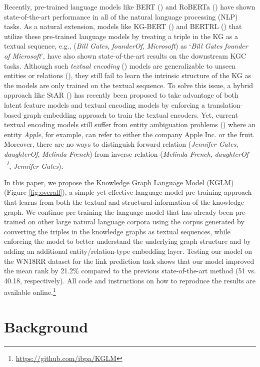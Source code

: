 \documentclass[11pt]{article}
\begin{document}
Recently, pre-trained language models like BERT (\citealp{devlin2018bert}) and RoBERTa (\citealp{liu2019roberta}) have shown state-of-the-art performance in all of the natural language processing (NLP) tasks. As a natural extension, models like KG-BERT (\citealp{yao2019kg}) and BERTRL (\citealp{zha2021inductive}) that utilize these pre-trained language models by treating a triple in the KG as a textual sequence, e.g., (\emph{Bill Gates}, \emph{founderOf}, \emph{Microsoft}) as `\emph{Bill Gates founder of Microsoft}', have also shown state-of-the-art results on the downstream KGC tasks. Although such \emph{textual encoding} (\citealp{wang2021structure}) models are generalizable to unseen entities or relations (\citealp{zha2021inductive}), they still fail to learn the intrinsic structure of the KG as the models are only trained on the textual sequence. To solve this issue, a hybrid approach like StAR (\citealp{wang2021structure}) has recently been proposed to take advantage of both latent feature models and textual encoding models by enforcing a translation-based graph embedding approach to train the textual encoders. Yet, current textual encoding models still suffer from entity ambiguation problems (\citealp{cucerzan2007large}) where an entity \emph{Apple}, for example, can refer to either the company Apple Inc. or the fruit. Moreover, there are no ways to distinguish forward relation (\emph{Jennifer Gates}, \emph{daughterOf}, \emph{Melinda French}) from inverse relation (\emph{Melinda French}, \emph{daughterOf\textsuperscript{  -1}}, \emph{Jennifer Gates}).


In this paper, we propose the Knowledge Graph Language Model (KGLM) (Figure \ref{fig:overall}), a simple yet effective language model pre-training approach that learns from both the textual and structural information of the knowledge graph. We continue pre-training the language model that has already been pre-trained on other large natural language corpora using the corpus generated by converting the triples in the knowledge graphs as textual sequences, while enforcing the model to better understand the underlying graph structure and by adding an additional entity/relation-type embedding layer. Testing our model on the WN18RR dataset for the link prediction task shows that our model improved the mean rank by 21.2\% compared to the previous state-of-the-art method (51 vs. 40.18, respectively). All code and instructions on how to reproduce the results are available online.\footnote{\url{https://github.com/ibpa/KGLM}}

\section{Background}
\end{document}
